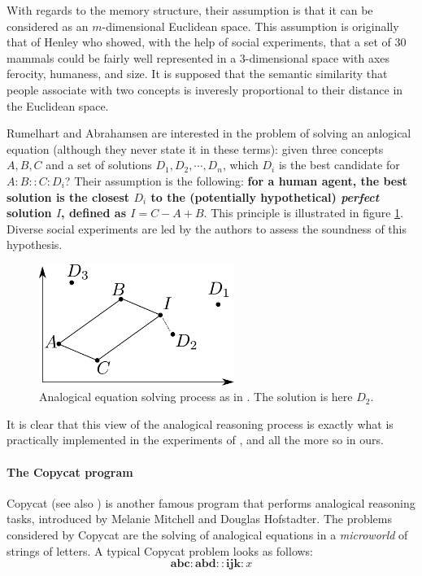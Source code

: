 With regards to the memory structure, their assumption is that it can be
considered as an $m$-dimensional Euclidean space. This assumption is originally
that of Henley \cite{Hen69} who showed, with the help of social experiments,
that a set of 30 mammals could be fairly well represented in a 3-dimensional
space with axes ferocity, humaness, and size. It is supposed that the semantic
similarity that people associate with two concepts is inveresly proportional to
their distance in the Euclidean space.

Rumelhart and Abrahamsen are interested in the problem of solving an anlogical
equation (although they never state it in these terms): given three concepts
$A, B, C$ and a set of solutions $D_1, D_2, \cdots, D_n$, which $D_i$ is the
best candidate for $A:B::C:D_i$? Their assumption is the following: \textbf{
for a human agent, the best solution is the closest $D_i$ to the (potentially
hypothetical) \textit{perfect} solution $I$, defined as $I = C - A + B$}. This
principle is illustrated in figure \ref{FIG:rumelhart_model}. Diverse social
experiments are led by the authors to assess the soundness of this hypothesis.

\begin{figure}[!h]
\centering
\includegraphics[width=2.5in]{figures/rumelhart_model.pdf}
  \caption{Analogical equation solving process as in \cite{RumAbr73}. The
  solution is here $D_2$.}
\label{FIG:rumelhart_model}
\end{figure}

It is clear that this view of the analogical reasoning process is exactly what
is practically implemented in the experiments of \cite{BayMicDelIJCAI07}, and
all the more so in ours.

\paragraph{The Copycat program\\}

Copycat \cite{Mit93} (see also \cite{HofMit94}) is another famous program that
performs analogical reasoning tasks, introduced by Melanie Mitchell and Douglas
Hofstadter. The problems considered by Copycat are the solving of analogical
equations in a \textit{microworld} of strings of letters. A typical Copycat
problem looks as follows: $$\mathbf{abc} : \mathbf{abd} :: \mathbf{ijk} : x$$

